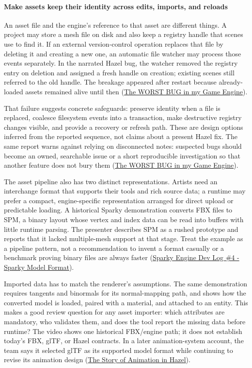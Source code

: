 \paragraph{Make assets keep their identity across edits, imports, and reloads}\label{make-assets-keep-their-identity-across-edits-imports-and-reloads}

An asset file and the engine's reference to that asset are different things. A project may store a mesh file on disk and also keep a registry handle that scenes use to find it. If an external version-control operation replaces that file by deleting it and creating a new one, an automatic file watcher may process those events separately. In the narrated Hazel bug, the watcher removed the registry entry on deletion and assigned a fresh handle on creation; existing scenes still referred to the old handle. The breakage appeared after restart because already-loaded assets remained alive until then (\href{https://www.youtube.com/watch?v=x5dy8T9dRPk&t=0m3s}{The WORST BUG in my Game Engine}).

That failure suggests concrete safeguards: preserve identity when a file is replaced, coalesce filesystem events into a transaction, make destructive registry changes visible, and provide a recovery or refresh path. These are design options inferred from the reported sequence, not claims about a present Hazel fix. The same report warns against relying on disconnected notes: suspected bugs should become an owned, searchable issue or a short reproducible investigation so that another feature does not bury them (\href{https://www.youtube.com/watch?v=x5dy8T9dRPk&t=4m55s}{The WORST BUG in my Game Engine}).

The asset pipeline also has two distinct representations. Artists need an interchange format that supports their tools and rich source data; a runtime may prefer a compact, engine-specific representation arranged for direct upload or predictable loading. A historical Sparky demonstration converts FBX files to SPM, a binary layout whose vertex and index data can be read into buffers with little runtime parsing. The presenter describes SPM as a rushed prototype and reports that it lacked multiple-mesh support at that stage. Treat the example as a pipeline pattern, not a recommendation to invent a format casually or a benchmark proving binary files are always faster (\href{https://www.youtube.com/watch?v=EUy8G3uMitI&t=3m47s}{Sparky Engine Dev Log \#4 - Sparky Model Format}).

Imported data has to match the renderer's assumptions. The same demonstration requires tangents and binormals for its normal-mapping path, and shows how the converted model is loaded, paired with a material, and attached to an entity. This makes a good review question for any asset importer: which attributes are mandatory, who validates them, and does the tool report the missing data before runtime? The video shows one historical FBX/engine path; it does not establish today's FBX, glTF, or Hazel contracts. In a later animation-system account, the team says it selected glTF as its supported model format while continuing to revise its animation design (\href{https://www.youtube.com/watch?v=HPZo1oFESYQ&t=2m45s}{The Story of Animation in Hazel}).

